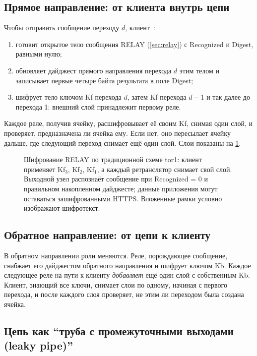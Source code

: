 \subsection{Прямое направление: от клиента внутрь цепи}

Чтобы отправить сообщение переходу $d$, клиент~:
\begin{enumerate}
  \item готовит открытое тело сообщения RELAY (\cref{sec:relay}) с Recognized и Digest, равными нулю;
  \item обновляет дайджест прямого направления перехода $d$ этим телом и записывает первые четыре байта результата в поле Digest;
  \item шифрует тело ключом Kf перехода $d$, затем Kf перехода $d-1$ и так далее до перехода 1: внешний слой принадлежит первому реле.
\end{enumerate}
Каждое реле, получив ячейку, расшифровывает её своим Kf, снимая один слой, и проверяет, предназначена ли ячейка ему. Если нет, оно пересылает ячейку дальше, где следующий переход снимает ещё один слой. Слои показаны на \cref{fig:cipolla}.

\begin{figure}[htbp]
\centering

\caption{Шифрование RELAY по традиционной схеме tor1: клиент применяет Kf$_3$, Kf$_2$, Kf$_1$, а каждый ретранслятор снимает свой слой. Выходной узел распознаёт сообщение при Recognized = 0 и правильном накопленном дайджесте; данные приложения могут оставаться зашифрованными HTTPS. Вложенные рамки условно изображают шифротекст.}
\label{fig:cipolla}
\end{figure}

\subsection{Обратное направление: от цепи к клиенту}

В обратном направлении роли меняются. Реле, порождающее сообщение, снабжает его дайджестом обратного направления и шифрует ключом Kb. Каждое следующее реле на пути к клиенту \emph{добавляет} ещё один слой с собственным Kb. Клиент, знающий все ключи, снимает слои по одному, начиная с первого перехода, и после каждого слоя проверяет, не этим ли переходом была создана ячейка.

\subsection{Цепь как \enquote{труба с промежуточными выходами (leaky pipe)}}

